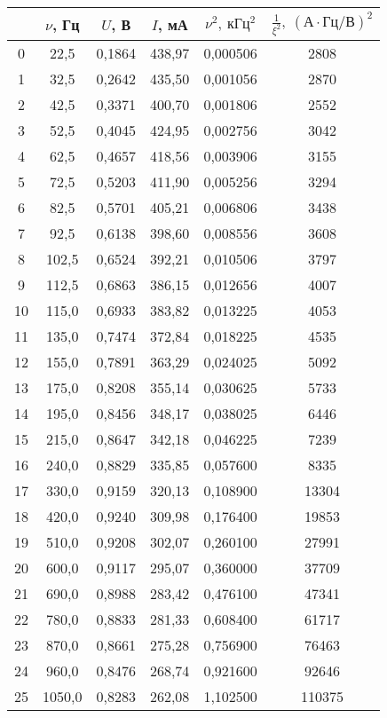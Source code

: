 \begin{table}
\centering
\begin{tabular}{|c|c|c|c|c|c|}
\hline
 & $\nu$, Гц & $U$, В & $I$, мА & $\nu^2,\ кГц^2$ & $\frac{1}{\xi^2},\ (А \cdot Гц / В)^2$ \\
\hline
0 & 22,5 & 0,1864 & 438,97 & 0,000506 & 2808 \\
\cline{1-6}
1 & 32,5 & 0,2642 & 435,50 & 0,001056 & 2870 \\
\cline{1-6}
2 & 42,5 & 0,3371 & 400,70 & 0,001806 & 2552 \\
\cline{1-6}
3 & 52,5 & 0,4045 & 424,95 & 0,002756 & 3042 \\
\cline{1-6}
4 & 62,5 & 0,4657 & 418,56 & 0,003906 & 3155 \\
\cline{1-6}
5 & 72,5 & 0,5203 & 411,90 & 0,005256 & 3294 \\
\cline{1-6}
6 & 82,5 & 0,5701 & 405,21 & 0,006806 & 3438 \\
\cline{1-6}
7 & 92,5 & 0,6138 & 398,60 & 0,008556 & 3608 \\
\cline{1-6}
8 & 102,5 & 0,6524 & 392,21 & 0,010506 & 3797 \\
\cline{1-6}
9 & 112,5 & 0,6863 & 386,15 & 0,012656 & 4007 \\
\cline{1-6}
10 & 115,0 & 0,6933 & 383,82 & 0,013225 & 4053 \\
\cline{1-6}
11 & 135,0 & 0,7474 & 372,84 & 0,018225 & 4535 \\
\cline{1-6}
12 & 155,0 & 0,7891 & 363,29 & 0,024025 & 5092 \\
\cline{1-6}
13 & 175,0 & 0,8208 & 355,14 & 0,030625 & 5733 \\
\cline{1-6}
14 & 195,0 & 0,8456 & 348,17 & 0,038025 & 6446 \\
\cline{1-6}
15 & 215,0 & 0,8647 & 342,18 & 0,046225 & 7239 \\
\cline{1-6}
16 & 240,0 & 0,8829 & 335,85 & 0,057600 & 8335 \\
\cline{1-6}
17 & 330,0 & 0,9159 & 320,13 & 0,108900 & 13304 \\
\cline{1-6}
18 & 420,0 & 0,9240 & 309,98 & 0,176400 & 19853 \\
\cline{1-6}
19 & 510,0 & 0,9208 & 302,07 & 0,260100 & 27991 \\
\cline{1-6}
20 & 600,0 & 0,9117 & 295,07 & 0,360000 & 37709 \\
\cline{1-6}
21 & 690,0 & 0,8988 & 283,42 & 0,476100 & 47341 \\
\cline{1-6}
22 & 780,0 & 0,8833 & 281,33 & 0,608400 & 61717 \\
\cline{1-6}
23 & 870,0 & 0,8661 & 275,28 & 0,756900 & 76463 \\
\cline{1-6}
24 & 960,0 & 0,8476 & 268,74 & 0,921600 & 92646 \\
\cline{1-6}
25 & 1050,0 & 0,8283 & 262,08 & 1,102500 & 110375 \\
\cline{1-6}
\hline
\end{tabular}
\end{table}

